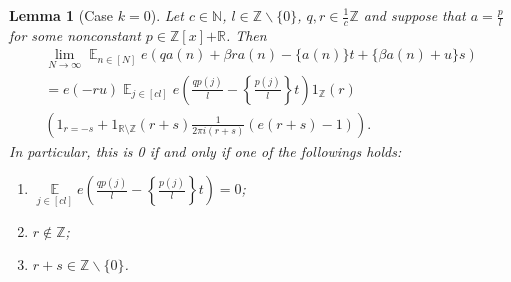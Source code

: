 \documentclass[11pt]{amsart}
\newtheorem{lemma}{Lemma}[section]
\theoremstyle{definition}
\DeclareMathOperator*{\E}{\mathbb{E}}
\newcommand{\N}{{\mathbb N}}
\newcommand{\R}{{\mathbb R}}
\newcommand{\Z}{{\mathbb Z}}
\newcommand{\CS}{{\mathcal S}}
\newcommand{\1}{{\mathbf{1}}}
\newcommand{\brac}[1]{\mathopen{}\left( #1 \mathclose{}\right)}
\newcommand{\rem}[1]{\left \{ #1 \right \}}
\begin{document}
\begin{lemma}[{Case $k=0$}]\label{L: a = p + g}
Let $c\in\N$, $l\in\Z\backslash\{0\}$, $q,r\in\frac{1}{c}\Z$ and suppose that $a = \frac{p}{l}$ for some nonconstant $p\in\Z[x]{+\R}$. Then
\begin{multline*}%
    \lim_{N\to\infty}\E_{n\in[N]} e(qa(n)+\beta r a(n)-\{ a(n)\}t +\{\beta a(n)+u\}s)\\
=e(-ru)\E_{j\in[cl]}e\brac{\frac{q p(j)}{l}-\rem{\frac{p(j)}{l}}t}1_\Z(r)\\
\brac{1_{r=-s} + 1_{\R\setminus\Z}(r+s)\frac{1}{2\pi i(r+s)}(e(r+s)-1)}.
\end{multline*}
 In particular, this is 0 if and only if one of the followings holds:
    \begin{enumerate}
    \item $\E\limits_{j\in[cl]}e\brac{\frac{q p(j)}{l}-\rem{\frac{p(j)}{l}}t}=0$;
    \item $r\notin \Z$;
    \item $r+s\in\mathbb{Z}\backslash\{0\}$.
\end{enumerate}
\end{lemma}


\end{document}
